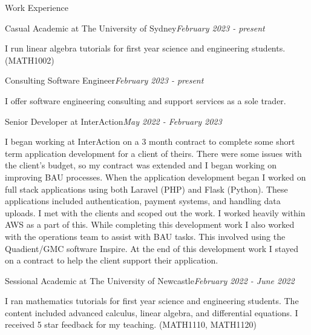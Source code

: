 \documentclass{resume} %
\begin{document}
\begin{rSection}{Work Experience}

    \begin{rSubsection}{Casual Academic at The University of Sydney}{\em February 2023 - present}{}{}
        \item I run linear algebra tutorials for first year science and engineering students. (MATH1002)
    \end{rSubsection}

    \begin{rSubsection}{Consulting Software Engineer}{\em February 2023 - present}{}{}
        \item I offer software engineering consulting and support services as a sole trader.
    \end{rSubsection}

    \begin{rSubsection}{Senior Developer at InterAction}{\em May 2022 - February 2023}{}{}
        \item I began working at InterAction on a 3 month contract to complete some short term application development for a client of theirs.
        There were some issues with the client's budget, so my contract was extended and I began working on improving BAU processes.
        When the application development began I worked on full stack applications using both Laravel (PHP) and Flask (Python).
        These applications included authentication, payment systems, and handling data uploads.
        I met with the clients and scoped out the work. I worked heavily within AWS as a part of this.
        While completing this development work I also worked with the operations team to assist with BAU tasks.
        This involved using the Quadient/GMC software Inspire. At the end of this development work I stayed on a contract to help the client support their application.
    \end{rSubsection}

    \begin{rSubsection}{Sessional Academic at The University of Newcastle}{\em February 2022 - June 2022}{}{}
        \item I ran mathematics tutorials for first year science and engineering students.
        The content included advanced calculus, linear algebra, and differential equations. I received 5 star feedback for my teaching. (MATH1110, MATH1120)
    \end{rSubsection}

    \newpage


\end{rSection}
\end{document}
